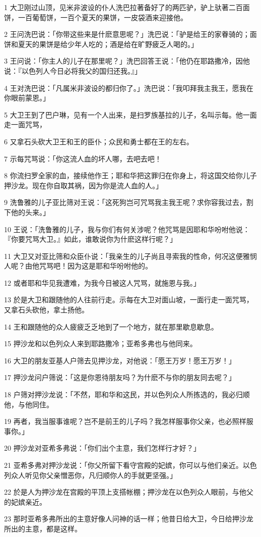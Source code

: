\par 1 大卫刚过山顶，见米非波设的仆人洗巴拉著备好了的两匹驴，驴上驮著二百面饼，一百葡萄饼，一百个夏天的果饼，一皮袋酒来迎接他。
\par 2 王问洗巴说：「你带这些来是什麽意思呢？」洗巴说：「驴是给王的家眷骑的；面饼和夏天的果饼是给少年人吃的；酒是给在旷野疲乏人喝的。」
\par 3 王问说：「你主人的儿子在那里呢？」洗巴回答王说：「他仍在耶路撒冷，因他说：『以色列人今日必将我父的国归还我。』」
\par 4 王对洗巴说：「凡属米非波设的都归你了。」洗巴说：「我叩拜我主我王，愿我在你眼前蒙恩。」
\par 5 大卫王到了巴户琳，见有一个人出来，是扫罗族基拉的儿子，名叫示每。他一面走一面咒骂，
\par 6 又拿石头砍大卫王和王的臣仆；众民和勇士都在王的左右。
\par 7 示每咒骂说：「你这流人血的坏人哪，去吧去吧！
\par 8 你流扫罗全家的血，接续他作王；耶和华把这罪归在你身上，将这国交给你儿子押沙龙。现在你自取其祸，因为你是流人血的人。」
\par 9 洗鲁雅的儿子亚比筛对王说：「这死狗岂可咒骂我主我王呢？求你容我过去，割下他的头来。」
\par 10 王说：「洗鲁雅的儿子，我与你们有何关涉呢？他咒骂是因耶和华吩咐他说：『你要咒骂大卫。』如此，谁敢说你为什麽这样行呢？」
\par 11 大卫又对亚比筛和众臣仆说：「我亲生的儿子尚且寻索我的性命，何况这便雅悯人呢？由他咒骂吧！因为这是耶和华吩咐他的。
\par 12 或者耶和华见我遭难，为我今日被这人咒骂，就施恩与我。」
\par 13 於是大卫和跟随他的人往前行走。示每在大卫对面山坡，一面行走一面咒骂，又拿石头砍他，拿土扬他。
\par 14 王和跟随他的众人疲疲乏乏地到了一个地方，就在那里歇息歇息。
\par 15 押沙龙和以色列众人来到耶路撒冷；亚希多弗也与他同来。
\par 16 大卫的朋友亚基人户筛去见押沙龙，对他说：「愿王万岁！愿王万岁！」
\par 17 押沙龙问户筛说：「这是你恩待朋友吗？为什麽不与你的朋友同去呢？」
\par 18 户筛对押沙龙说：「不然，耶和华和这民，并以色列众人所拣选的，我必归顺他，与他同住。
\par 19 再者，我当服事谁呢？岂不是前王的儿子吗？我怎样服事你父亲，也必照样服事你。」
\par 20 押沙龙对亚希多弗说：「你们出个主意，我们怎样行才好？」
\par 21 亚希多弗对押沙龙说：「你父所留下看守宫殿的妃嫔，你可以与他们亲近。以色列众人听见你父亲憎恶你，凡归顺你人的手就更坚强。」
\par 22 於是人为押沙龙在宫殿的平顶上支搭帐棚；押沙龙在以色列众人眼前，与他父的妃嫔亲近。
\par 23 那时亚希多弗所出的主意好像人问神的话一样；他昔日给大卫，今日给押沙龙所出的主意，都是这样。

